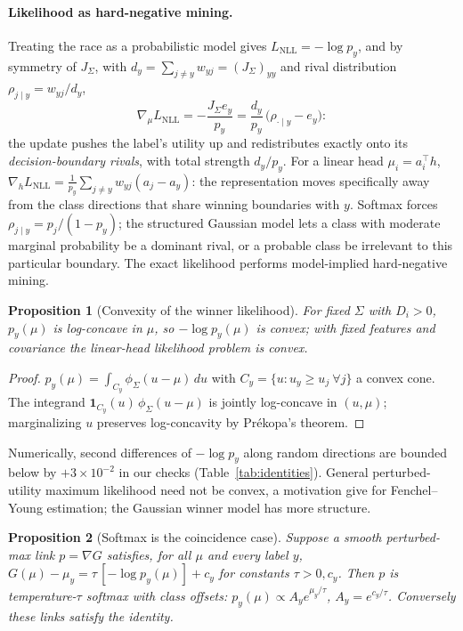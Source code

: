 \documentclass[11pt]{article}
\newtheorem{proposition}{Proposition}
\theoremstyle{remark}
\begin{document}
\paragraph{Likelihood as hard-negative mining.} Treating the race as a
probabilistic model gives $L_{\mathrm{NLL}} = -\log p_y$, and by
symmetry of $J_\Sigma$, with $d_y = \sum_{j \ne y} w_{yj} = (J_\Sigma)_{yy}$
and rival distribution $\rho_{j \mid y} = w_{yj} / d_y$,
\[
\nabla_\mu L_{\mathrm{NLL}} = -\frac{J_\Sigma e_y}{p_y}
= \frac{d_y}{p_y}\,\big( \rho_{\cdot \mid y} - e_y \big) :
\]
the update pushes the label's utility up and redistributes exactly onto
its \emph{decision-boundary rivals}, with total strength $d_y / p_y$.
For a linear head $\mu_i = a_i^\top h$, $\nabla_h L_{\mathrm{NLL}} =
\frac{1}{p_y} \sum_{j \ne y} w_{yj} (a_j - a_y)$: the representation
moves specifically away from the class directions that share winning
boundaries with $y$. Softmax forces $\rho_{j \mid y} = p_j / (1 -
p_y)$; the structured Gaussian model lets a class with moderate
marginal probability be a dominant rival, or a probable class be
irrelevant to this particular boundary. The exact likelihood performs
model-implied hard-negative mining.

\begin{proposition}[Convexity of the winner likelihood]
\label{prop:convex}
For fixed $\Sigma$ with $D_i > 0$, $p_y(\mu)$ is log-concave in $\mu$,
so $-\log p_y(\mu)$ is convex; with fixed features and covariance the
linear-head likelihood problem is convex.
\end{proposition}

\begin{proof}
$p_y(\mu) = \int_{C_y} \phi_\Sigma(u - \mu)\, du$ with $C_y = \{u : u_y
\ge u_j\ \forall j\}$ a convex cone. The integrand
$\mathbf{1}_{C_y}(u)\, \phi_\Sigma(u - \mu)$ is jointly log-concave in
$(u, \mu)$; marginalizing $u$ preserves log-concavity by Pr\'ekopa's
theorem.
\end{proof}

Numerically, second differences of $-\log p_y$ along random directions
are bounded below by $+3\times10^{-2}$ in our checks
(Table~\ref{tab:identities}). General perturbed-utility maximum
likelihood need not be convex, a motivation \citet{lin2026} give for
Fenchel--Young estimation; the Gaussian winner model has more
structure.

\begin{proposition}[Softmax is the coincidence case]
\label{prop:unique}
Suppose a smooth perturbed-max link $p = \nabla G$ satisfies, for all
$\mu$ and every label $y$, $G(\mu) - \mu_y = \tau\,[-\log p_y(\mu)] +
c_y$ for constants $\tau > 0, c_y$. Then $p$ is temperature-$\tau$
softmax with class offsets: $p_y(\mu) \propto A_y e^{\mu_y/\tau}$,
$A_y = e^{c_y/\tau}$. Conversely these links satisfy the identity.
\end{proposition}
\end{document}
